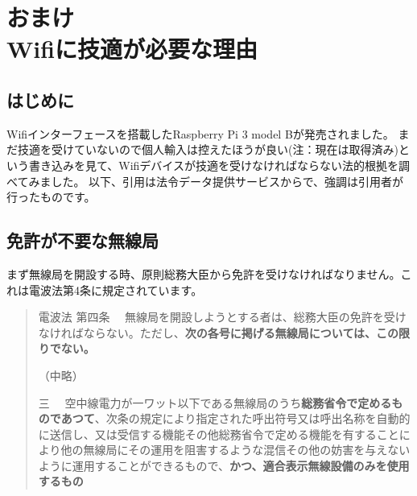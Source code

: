 \chapter*{おまけ\\Wifiに技適が必要な理由}

\section*{はじめに}
Wifiインターフェースを搭載したRaspberry Pi 3 model Bが発売されました。
まだ技適を受けていないので個人輸入は控えたほうが良い(注：現在は取得済み)という書き込みを見て、Wifiデバイスが技適を受けなければならない法的根拠を調べてみました。 以下、引用は法令データ提供サービスからで、強調は引用者が行ったものです。

\section*{免許が不要な無線局}

まず無線局を開設する時、原則総務大臣から免許を受けなければなりません。これは電波法第4条に規定されています。
\begin{quotation}
    電波法 第四条 　無線局を開設しようとする者は、総務大臣の免許を受けなければならない。ただし、\textbf{次の各号に掲げる無線局については、この限りでない。}

    （中略）

    三 　空中線電力が一ワット以下である無線局のうち\textbf{総務省令で定めるものであつて}、次条の規定により指定された呼出符号又は呼出名称を自動的に送信し、又は受信する機能その他総務省令で定める機能を有することにより他の無線局にその運用を阻害するような混信その他の妨害を与えないように運用することができるもので、\textbf{かつ、適合表示無線設備のみを使用するもの}
\end{quotation}

